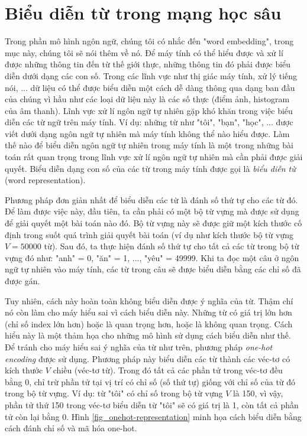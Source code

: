 \section{Biểu diễn từ trong mạng học sâu} \label{wordembeddingsection}
Trong phần mô hình ngôn ngữ, chúng tôi có nhắc đến "word embedding", trong mục này, chúng tôi sẽ nói thêm về nó. Để máy tính có thể hiểu được và xử lí được những thông tin đến từ thế giới thực, những thông tin đó phải được biểu diễn dưới dạng các con số. Trong các lĩnh vực như thị giác máy tính, xử lý tiếng nói, ... dữ liệu có thể được biểu diễn một cách dễ dàng thông qua dạng ban đầu của chúng vì hầu như các loại dữ liệu này là các số thực (điểm ảnh, histogram của âm thanh). Lĩnh vực xử lí ngôn ngữ tự nhiên gặp khó khăn trong việc biểu diễn các từ ngữ trên máy tính. Ví dụ: những từ như "tôi", "bạn", "học", ... được viết dưới dạng ngôn ngữ tự nhiên mà máy tính không thể nào hiểu được. Làm thế nào để biểu diễn ngôn ngữ tự nhiên trong máy tính là một trong những bài toán rất quan trọng trong lĩnh vực xử lí ngôn ngữ tự nhiên mà cần phải được giải quyết. Biểu diễn dạng con số của các từ trong máy tính được gọi là \textit{biểu diễn từ} (word representation).

Phương pháp đơn giản nhất để biểu diễn các từ là đánh số thứ tự cho các từ đó. Để làm được việc này, đầu tiên, ta cần phải có một bộ từ vựng mà được sử dụng để giải quyết một bài toán nào đó. Bộ từ vựng này sẽ được giữ một kích thước cố định trong suốt quá trình giải quyết bài toán (ví dụ như kích thước bộ từ vựng $V = 50000$ từ). Sau đó, ta thực hiện đánh số thứ tự cho tất cả các từ trong bộ từ vựng đó như: "anh" = 0, "ăn" = 1, ..., "yêu" = 49999. Khi ta đọc một câu ở ngôn ngữ tự nhiên vào máy tính, các từ trong câu sẽ được biểu diễn bằng các chỉ số đã được gán.

Tuy nhiên, cách này hoàn toàn không biểu diễn được ý nghĩa của từ. Thậm chí nó còn làm cho máy hiểu sai vì cách biểu diễn này. Những từ có giá trị lớn hơn (chỉ số index lớn hơn) hoặc là quan trọng hơn, hoặc là không quan trọng. Cách hiểu này là một thảm họa cho những mô hình sử dụng cách biểu diễn như thế. Để tránh cho máy hiểu sai ý nghĩa của từ như trên, phương pháp \textit{one-hot encoding} được sử dụng. Phương pháp này biểu diễn các từ thành các véc-tơ có kích thước $V$ chiều (véc-tơ từ). Trong đó tất cả các phần tử trong véc-tơ đều bằng 0, chỉ trừ phần tử tại vị trí có chỉ số (số thứ tự) giống với chỉ số của từ đó trong bộ từ vựng. Ví dụ: từ "tôi" có chỉ số trong bộ từ vựng $V$ là 150, vì vậy, phần tử thứ 150 trong véc-tơ biểu diễn từ "tôi" sẽ có giá trị là 1, còn tất cả phần tử còn lại bằng 0. Hình \ref{fig_onehot-representation} minh họa cách biểu diễn bằng cách đánh chỉ số và mã hóa one-hot.

